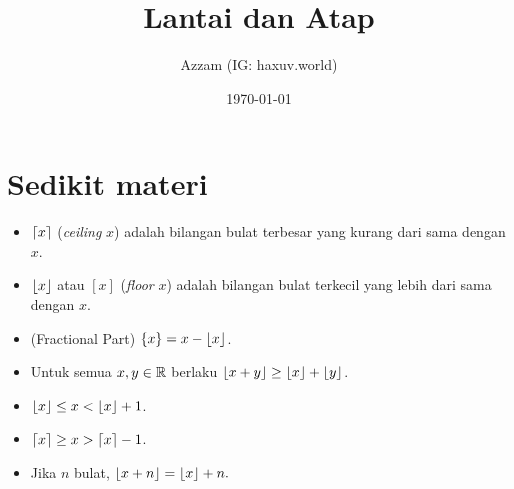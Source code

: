 \documentclass[11pt]{scrartcl}
\title{Lantai dan Atap}
\author{Azzam (IG: haxuv.world)}
\date{\today}
\begin{document}
\maketitle
\section{Sedikit materi}
\begin{itemize}
    \item $\left\lceil x \right\rceil$ (\textit{ceiling} $x$) adalah bilangan bulat terbesar yang kurang dari sama dengan $x$.
    \item $\left\lfloor x \right\rfloor$ atau $[x]$ (\textit{floor} $x$) adalah bilangan bulat terkecil yang lebih dari sama dengan $x$.
    \item (Fractional Part) $\{x\} = x - \left\lfloor x \right\rfloor$.
    \item Untuk semua $x,y \in \mathbb R$ berlaku $\left\lfloor x+y \right\rfloor \ge \left\lfloor x \right\rfloor+\left\lfloor y \right\rfloor$.
    \item $\left\lfloor x \right\rfloor \le x < \left\lfloor x \right\rfloor+1$.
    \item $\left\lceil x \right\rceil \ge x > \left\lceil x \right\rceil-1$.
    \item Jika $n$ bulat, $\left\lfloor x+n \right\rfloor=\left\lfloor x \right\rfloor+n.$
\end{itemize}
\end{document}
